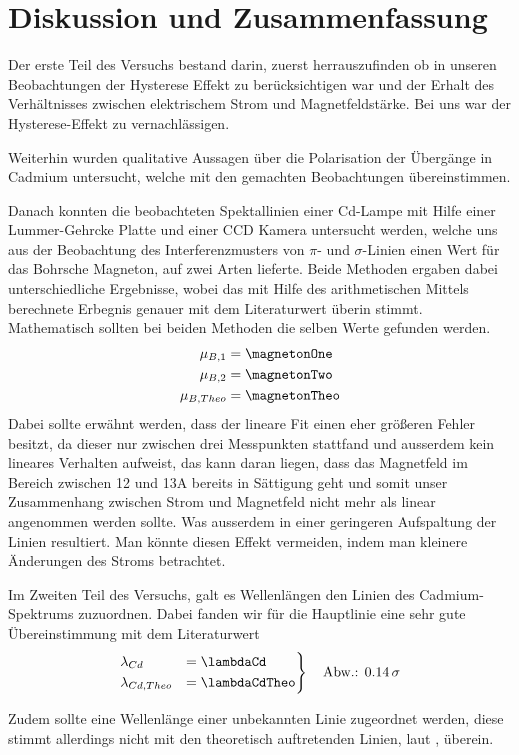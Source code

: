 \section{Diskussion und Zusammenfassung}
  Der erste Teil des Versuchs bestand darin, zuerst herrauszufinden ob in unseren Beobachtungen der Hysterese Effekt zu berücksichtigen war und der Erhalt des Verhältnisses zwischen elektrischem Strom und Magnetfeldstärke.
  Bei uns war der Hysterese-Effekt zu vernachlässigen.

  Weiterhin wurden qualitative Aussagen über die Polarisation der Übergänge in Cadmium untersucht, welche mit den gemachten Beobachtungen übereinstimmen.

  Danach konnten die beobachteten Spektallinien einer Cd-Lampe mit Hilfe einer Lummer-Gehrcke Platte und einer CCD Kamera untersucht werden, welche uns aus der Beobachtung des Interferenzmusters von $\pi$- und $\sigma$-Linien einen Wert für das Bohrsche Magneton, auf zwei Arten lieferte. Beide Methoden ergaben dabei unterschiedliche Ergebnisse, wobei das mit Hilfe des arithmetischen Mittels berechnete Erbegnis genauer mit dem Literaturwert überin stimmt. Mathematisch sollten bei beiden Methoden die selben Werte gefunden werden.
  \begin{align*}
    \mu_{B,1} &= \magnetonOne\\
    \mu_{B,2} &= \magnetonTwo\\
    \mu_{B,Theo} & = \magnetonTheo
  \end{align*}
  Dabei sollte erwähnt werden, dass der lineare Fit einen eher größeren Fehler besitzt, da dieser nur zwischen drei Messpunkten stattfand und ausserdem kein lineares Verhalten aufweist, das kann daran liegen, dass das Magnetfeld im Bereich zwischen 12 und 13A bereits in Sättigung geht und somit unser Zusammenhang zwischen Strom und Magnetfeld nicht mehr als linear angenommen werden sollte. Was ausserdem in einer geringeren Aufspaltung der Linien resultiert.
  Man könnte diesen Effekt vermeiden, indem man kleinere Änderungen des Stroms betrachtet.

  Im Zweiten Teil des Versuchs, galt es Wellenlängen den Linien des Cadmium-Spektrums zuzuordnen. Dabei fanden wir für die Hauptlinie eine sehr gute Übereinstimmung mit dem Literaturwert
  \begin{align*}
    \begin{rcases}
      \lambda_{Cd} &=\lambdaCd \quad\\
      \lambda_{Cd, Theo} &= \lambdaCdTheo
    \end{rcases}
    \quad\text{Abw.: }\SI{.14}{\sigma}
  \end{align*}

  Zudem sollte eine Wellenlänge einer unbekannten Linie zugeordnet werden, diese stimmt allerdings nicht mit den theoretisch auftretenden Linien, laut \cite{nist.gov.cd}, überein.
